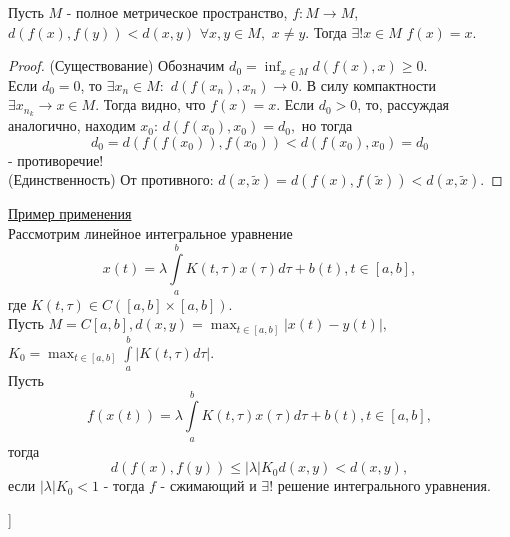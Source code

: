 \begin{theorem}
Пусть $M$ - полное метрическое пространство, $f:M \rightarrow M$, $d(f(x), f(y)) < d(x, y)$ $\forall x, y \in M,$ $x \neq y.$ Тогда $\exists!x \in M$ $f(x)=x$.
\end{theorem}
\begin{proof}
    (Существование) Обозначим $d_0=\inf_{x \in M}{d(f(x), x)} \geq 0.$ \\
    Если $d_0 = 0$, то $\exists x_n \in M:$ $d(f(x_n), x_n) \rightarrow 0.$ В силу компактности $\exists x_{n_k} \rightarrow x \in M$. Тогда видно, что $f(x)=x$.
    Если $d_0 > 0$, то, рассуждая аналогично, находим $x_0$: $d(f(x_0), x_0)=d_0,$ но тогда
    \begin{equation*}
        d_0 = d(f(f(x_0)), f(x_0)) < d(f(x_0), x_0) = d_0
    \end{equation*}
    - противоречие! \\
    (Единственность) От противного: $d(x, \tilde{x})=d(f(x),f(\tilde{x})) < d(x, \tilde{x}).$
\end{proof}

{\large \underline{Пример применения}} \\
Рассмотрим линейное интегральное уравнение
\begin{equation*}
    x(t) = \lambda \int\limits_a^b K(t, \tau)x(\tau)d\tau + b(t), t \in [a,b],
\end{equation*}
где $K(t, \tau) \in C([a,b] \times [a,b]).$ \\
Пусть $M=C[a,b], d(x,y) = \max_{t \in [a,b]}|x(t)-y(t)|,$ $ K_0 = \max_{t \in [a,b]} \int\limits_a^b|K(t,\tau)d\tau|.$ \\
Пусть 
\begin{equation*}
    f(x(t)) = \lambda \int\limits_a^b K(t, \tau)x(\tau)d\tau + b(t), t \in [a,b],
\end{equation*}
тогда
\begin{equation*}
    d(f(x), f(y)) \leq |\lambda|K_0d(x,y) < d(x,y),
\end{equation*}
если $|\lambda|K_0 < 1$ - тогда $f$ - сжимающий и $\exists!$ решение интегрального уравнения.

\bigbreak
[\cite[page 49-52]{t_dop7}]